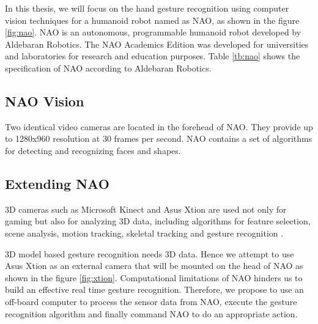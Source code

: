 In this thesis, we will focus on the hand gesture recognition using computer vision techniques for a humanoid robot named as NAO, as shown in the figure \ref{fig:nao}. NAO is an autonomous, programmable humanoid robot developed by Aldebaran Robotics. The NAO Academics Edition was developed for universities and laboratories for research and education purposes. Table \ref{tb:nao} shows the specification of NAO according to Aldebaran Robotics.

\subsection{NAO Vision} Two identical video cameras are located in the forehead of NAO. They provide up to 1280x960 resolution at 30 frames per second. NAO contains a set of algorithms for detecting and recognizing faces and shapes.

\subsection{Extending NAO} 
3D cameras such as Microsoft Kinect and Asus Xtion are used not only for gaming but also for analyzing 3D data, including algorithms for feature selection, scene analysis, motion tracking, skeletal tracking and gesture recognition \cite{12}. 

3D model based gesture recognition needs 3D data. Hence we attempt to use Asus Xtion as an external camera that will be mounted on the head of NAO as shown in the figure \ref{fig:xtion}. Computational limitations of NAO hinders us to build an effective real time gesture recognition. Therefore, we propose to use an off-board computer to process the sensor data from NAO, execute the gesture recognition algorithm and finally command NAO to do an appropriate action.

